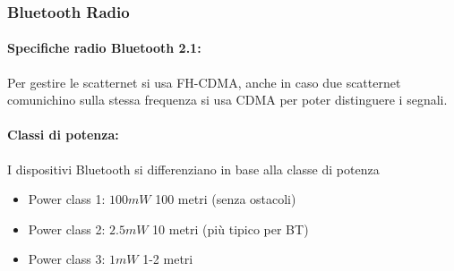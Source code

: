 \subsubsection{Bluetooth Radio}
\paragraph{Specifiche radio Bluetooth 2.1:}
\begin{center}
	{
	}
\end{center}
Per gestire le scatternet si usa FH-CDMA, anche in caso due scatternet comunichino sulla stessa frequenza si usa CDMA per poter distinguere i segnali.\\

\paragraph{Classi di potenza:} I dispositivi Bluetooth si differenziano in base alla classe di potenza
\begin{itemize}
	\item Power class 1: $100 mW$ 100 metri (senza ostacoli)
	\item Power class 2: $2.5 mW$ 10 metri (più tipico per BT)
	\item Power class 3: $1 mW$ 1-2 metri
\end{itemize}

